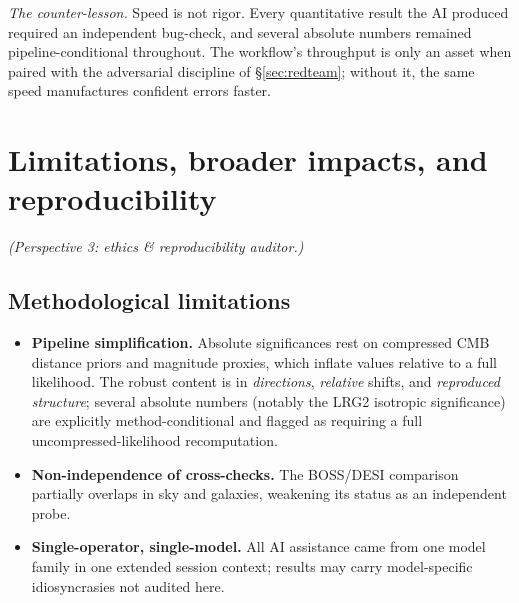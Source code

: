 \documentclass[11pt]{article}
\begin{document}
\begin{caveatbox}
\textit{The counter-lesson.} Speed is not rigor. Every quantitative result the AI produced required an independent bug-check, and several absolute numbers remained pipeline-conditional throughout. The workflow's throughput is only an asset when paired with the adversarial discipline of \S\ref{sec:redteam}; without it, the same speed manufactures confident errors faster.
\end{caveatbox}

\section{Limitations, broader impacts, and reproducibility}
\label{sec:limits}
\emph{(Perspective 3: ethics \& reproducibility auditor.)}

\subsection{Methodological limitations}
\begin{itemize}[leftmargin=1.4em,itemsep=2pt]
\item \textbf{Pipeline simplification.} Absolute significances rest on compressed CMB distance priors and magnitude proxies, which inflate values relative to a full likelihood. The robust content is in \emph{directions}, \emph{relative} shifts, and \emph{reproduced structure}; several absolute numbers (notably the LRG2 isotropic significance) are explicitly method-conditional and flagged as requiring a full uncompressed-likelihood recomputation.
\item \textbf{Non-independence of cross-checks.} The BOSS/DESI comparison partially overlaps in sky and galaxies, weakening its status as an independent probe.
\item \textbf{Single-operator, single-model.} All AI assistance came from one model family in one extended session context; results may carry model-specific idiosyncrasies not audited here.
\end{itemize}
\end{document}

